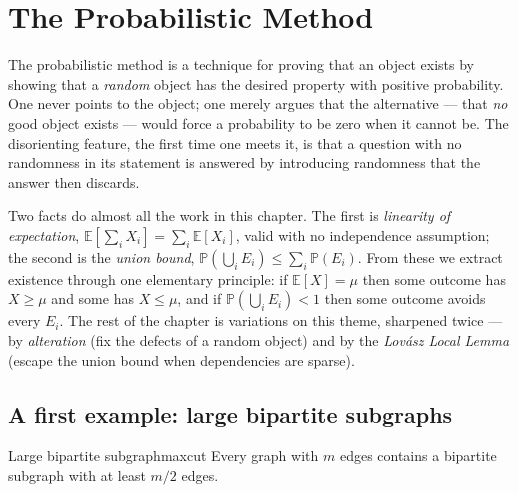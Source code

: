 \providecommand{\E}{\mathbb{E}}
\providecommand{\Prob}{\mathbb{P}}
\providecommand{\ind}{\mathbf{1}}

\chapter{The Probabilistic Method}
\label{chap:intro}

The probabilistic method is a technique for proving that an object exists by
showing that a \emph{random} object has the desired property with positive
probability. One never points to the object; one merely argues that the
alternative --- that \emph{no} good object exists --- would force a
probability to be zero when it cannot be. The disorienting feature, the first
time one meets it, is that a question with no randomness in its statement is
answered by introducing randomness that the answer then discards.

Two facts do almost all the work in this chapter. The first is \emph{linearity
of expectation}, $\E[\sum_i X_i]=\sum_i\E[X_i]$, valid with no independence
assumption; the second is the \emph{union bound},
$\Prob(\bigcup_i E_i)\le\sum_i\Prob(E_i)$. From these we extract existence
through one elementary principle: if $\E[X]=\mu$ then some outcome has
$X\ge\mu$ and some has $X\le\mu$, and if $\Prob(\bigcup_i E_i)<1$ then some
outcome avoids every $E_i$. The rest of the chapter is variations on this
theme, sharpened twice --- by \emph{alteration} (fix the defects of a random
object) and by the \emph{Lov\'asz Local Lemma} (escape the union bound when
dependencies are sparse).

\section{A first example: large bipartite subgraphs}

\begin{theorem}{Large bipartite subgraph}{maxcut}
Every graph with $m$ edges contains a bipartite subgraph with at least $m/2$
edges.
\end{theorem}

